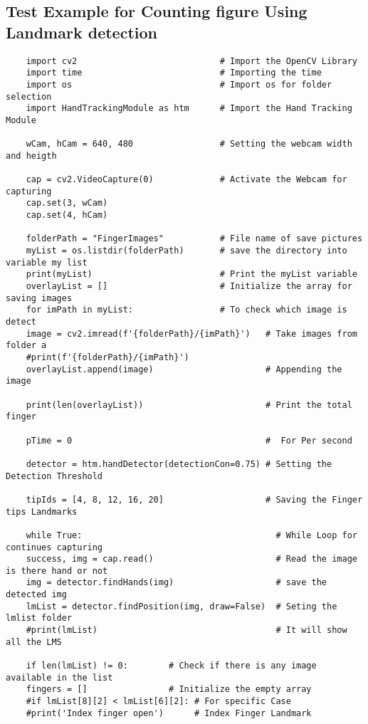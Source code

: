 \subsection{Test Example for Counting figure Using Landmark detection}

\begin{verbatim}
	import cv2                            # Import the OpenCV Library
	import time                           # Importing the time
	import os                             # Import os for folder selection
	import HandTrackingModule as htm      # Import the Hand Tracking Module
	
	wCam, hCam = 640, 480                 # Setting the webcam width and heigth
	
	cap = cv2.VideoCapture(0)             # Activate the Webcam for capturing
	cap.set(3, wCam)
	cap.set(4, hCam)
	
	folderPath = "FingerImages"           # File name of save pictures
	myList = os.listdir(folderPath)       # save the directory into variable my list
	print(myList)                         # Print the myList variable
	overlayList = []                      # Initialize the array for saving images
	for imPath in myList:                 # To check which image is detect
	image = cv2.imread(f'{folderPath}/{imPath}')   # Take images from folder a
	#print(f'{folderPath}/{imPath}')
	overlayList.append(image)                      # Appending the image 
	
	print(len(overlayList))                        # Print the total finger 
	
	pTime = 0                                      #  For Per second
	
	detector = htm.handDetector(detectionCon=0.75) # Setting the Detection Threshold
	
	tipIds = [4, 8, 12, 16, 20]                    # Saving the Finger tips Landmarks 
	
	while True:                                      # While Loop for continues capturing
	success, img = cap.read()                        # Read the image is there hand or not
	img = detector.findHands(img)                    # save the detected img
	lmList = detector.findPosition(img, draw=False)  # Seting the lmlist folder
	#print(lmList)                                   # It will show all the LMS
	
	if len(lmList) != 0:        # Check if there is any image available in the list
	fingers = []                # Initialize the empty array
	#if lmList[8][2] < lmList[6][2]: # For specific Case
	#print('Index finger open')      # Index Finger Landmark
	

\end{verbatim}
